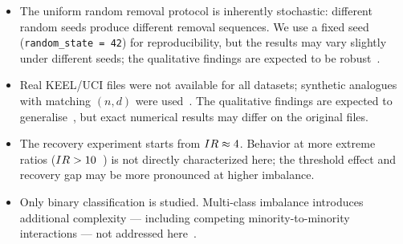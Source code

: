 \begin{itemize}[leftmargin=*]
  \item The uniform random removal protocol is inherently stochastic: different random seeds produce different removal sequences.
  We use a fixed seed (\texttt{random\_state = 42}) for reproducibility, but the results may vary slightly under different seeds; the qualitative findings are expected to be robust~\cite{weiss2003effect}.

  \item Real KEEL/UCI files were not available for all datasets; synthetic analogues with matching $(n, d)$ were used~\cite{blagus2013smote}.
  The qualitative findings are expected to generalise~\cite{fernandez2018learning}, but exact numerical results may differ on the original files.

  \item The recovery experiment starts from $IR \approx 4$.
  Behavior at more extreme ratios ($IR > 10$~\cite{he2009learning}) is not directly characterized here; the threshold effect and recovery gap may be more pronounced at higher imbalance.

  \item Only binary classification is studied.
  Multi-class imbalance introduces additional complexity --- including competing minority-to-minority interactions --- not addressed here~\cite{fernandez2018learning, haixiang2017learning}.
\end{itemize}
